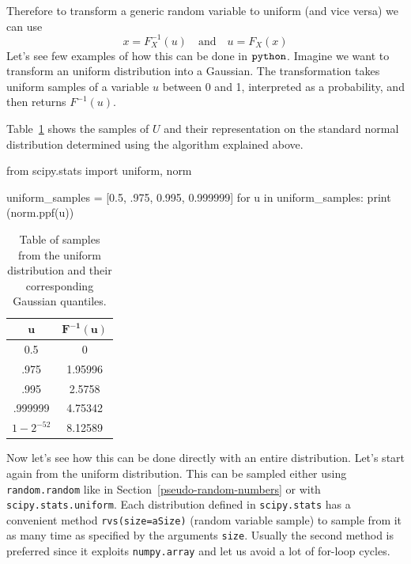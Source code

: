 Therefore to transform a generic random variable to uniform (and vice versa) we can use
\begin{equation}
x = F_{X}^{-1}(u)\quad\mathrm{and}\quad u = F_X(x)	
\end{equation} 
Let's see few examples of how this can be done in \(\tt{python}\). Imagine we want to transform an uniform distribution into a Gaussian. The transformation takes uniform samples of a variable \(u\) between 0 and 1, interpreted as a probability, and then returns $F^{-1}(u)$. 

Table~\ref{tab:transformation} shows the samples of $U$ and their representation on the standard normal distribution determined using the algorithm explained above.

\begin{ipython}
from scipy.stats import uniform, norm

uniform_samples = [0.5, .975, 0.995, 0.999999]
for u in uniform_samples:
    print (norm.ppf(u))
\end{ipython}

\begin{table}[h]
  \centering
  \begin{tabular}{|c|c|}
    \hline
    \(\mathbf{u}\) & \(\mathbf{F^{-1}(u)}\) \\
    \hline
    0.5 & 0 \\
    \hline
    .975 & 1.95996 \\
    \hline
    .995 & 2.5758 \\
    \hline
    .999999 & 4.75342 \\
    \hline
    \(1-2^{-52}\) & 8.12589 \\
    \hline
  \end{tabular}
  \caption{Table of samples from the uniform distribution and their corresponding Gaussian quantiles.}
\label{tab:transformation}
\end{table}

Now let's see how this can be done directly with an entire distribution. Let's start again from the uniform distribution. This can be sampled either using \texttt{random.random} like in Section~\ref{pseudo-random-numbers} or with \texttt{scipy.stats.uniform}. 
Each distribution defined in \texttt{scipy.stats} has a convenient method \texttt{rvs(size=aSize)} (random variable sample) to sample from it as many time as specified by the arguments \texttt{size}. Usually the second method is preferred since it exploits \texttt{numpy.array} and let us avoid a lot of for-loop cycles.

